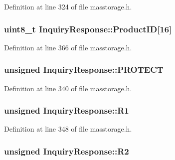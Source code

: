 \-Definition at line 324 of file masstorage.\-h.

\hypertarget{struct_inquiry_response_a02c12d5c3f7b9e821c6f28dc827f5629}{
\subsubsection[{\-Product\-I\-D}]{\setlength{\rightskip}{0pt plus 5cm}uint8\-\_\-t {\bf \-Inquiry\-Response\-::\-Product\-I\-D}\mbox{[}16\mbox{]}}}\label{struct_inquiry_response_a02c12d5c3f7b9e821c6f28dc827f5629}


\-Definition at line 366 of file masstorage.\-h.

\hypertarget{struct_inquiry_response_a0acb31c77f25be1d6e37c827147645af}{
\subsubsection[{\-P\-R\-O\-T\-E\-C\-T}]{\setlength{\rightskip}{0pt plus 5cm}unsigned {\bf \-Inquiry\-Response\-::\-P\-R\-O\-T\-E\-C\-T}}}\label{struct_inquiry_response_a0acb31c77f25be1d6e37c827147645af}


\-Definition at line 340 of file masstorage.\-h.

\hypertarget{struct_inquiry_response_a72abbdbd399647227ea05cb1cec32b2d}{
\subsubsection[{\-R1}]{\setlength{\rightskip}{0pt plus 5cm}unsigned {\bf \-Inquiry\-Response\-::\-R1}}}\label{struct_inquiry_response_a72abbdbd399647227ea05cb1cec32b2d}


\-Definition at line 348 of file masstorage.\-h.

\hypertarget{struct_inquiry_response_aa635575deb7f984d27142ee2071af5b3}{
\subsubsection[{\-R2}]{\setlength{\rightskip}{0pt plus 5cm}unsigned {\bf \-Inquiry\-Response\-::\-R2}}}\label{struct_inquiry_response_aa635575deb7f984d27142ee2071af5b3}


